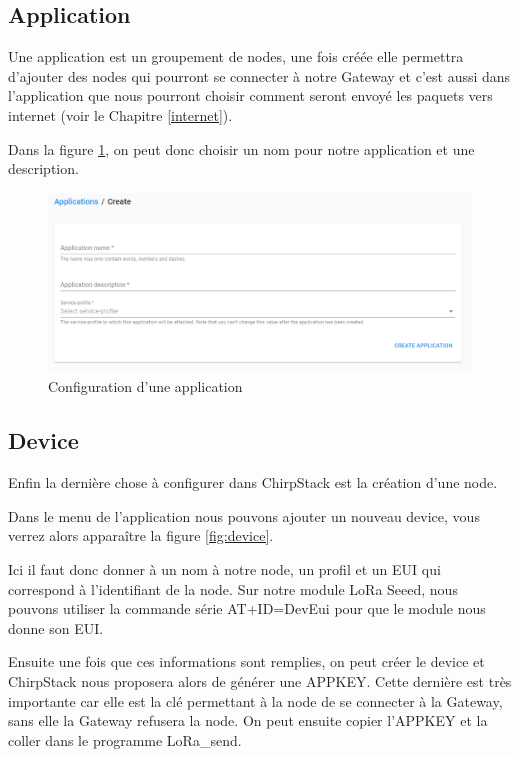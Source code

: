 \documentclass{article}
\begin{document}
		\subsection{Application}
			Une application est un groupement de nodes, une fois créée elle permettra d'ajouter des nodes qui pourront se connecter à notre Gateway et c'est aussi dans l'application que nous pourront choisir comment seront envoyé les paquets vers internet (voir le Chapitre \ref{internet}).
			
			Dans la figure \ref{fig:application}, on peut donc choisir un nom pour notre application et une description.
			
			\begin{figure}[H]
				\centering
				\includegraphics[width=0.7\linewidth]{application}
				\caption{Configuration d'une application}
				\label{fig:application}
			\end{figure}
			
		\subsection{Device}
			Enfin la dernière chose à configurer dans ChirpStack est la création d'une node.
			
			Dans le menu de l'application nous pouvons ajouter un nouveau device, vous verrez alors apparaître la figure \ref{fig:device}.
			
			Ici il faut donc donner à un nom à notre node, un profil et un EUI qui correspond à l'identifiant de la node. Sur notre module LoRa Seeed, nous pouvons utiliser la commande série AT+ID=DevEui pour que le module nous donne son EUI.
			
			Ensuite une fois que ces informations sont remplies, on peut créer le device et ChirpStack nous proposera alors de générer une APPKEY. Cette dernière est très importante car elle est la clé permettant à la node de se connecter à la Gateway, sans elle la Gateway refusera la node. On peut ensuite copier l'APPKEY et la coller dans le programme LoRa\_send.
				
\end{document}
